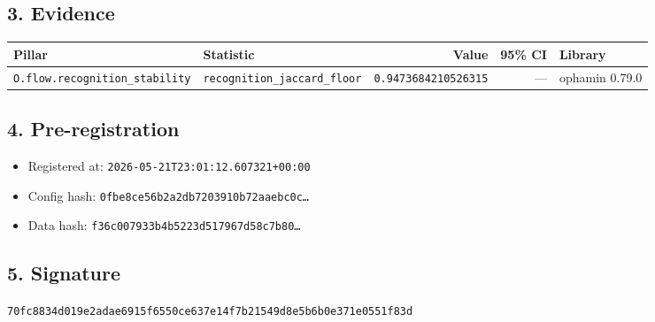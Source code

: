 \documentclass{article}
\begin{document}
\subsection*{3. Evidence}
\begin{tabular}{llrrl}\toprule
\textbf{Pillar} & \textbf{Statistic} & \textbf{Value} & \textbf{95\% CI} & \textbf{Library} \\\midrule
\texttt{O.flow.recognition\_stability} & \texttt{recognition\_jaccard\_floor} & \texttt{0.9473684210526315} & --- & ophamin 0.79.0 \\
\bottomrule\end{tabular}
\subsection*{4. Pre-registration}
\begin{itemize}
\item Registered at: \texttt{2026-05-21T23:01:12.607321+00:00}
\item Config hash: \texttt{0fbe8ce56b2a2db7203910b72aaebc0c\dots}
\item Data hash: \texttt{f36c007933b4b5223d517967d58c7b80\dots}
\end{itemize}
\subsection*{5. Signature}
\texttt{70fc8834d019e2adae6915f6550ce637e14f7b21549d8e5b6b0e371e0551f83d}\\
\end{document}

